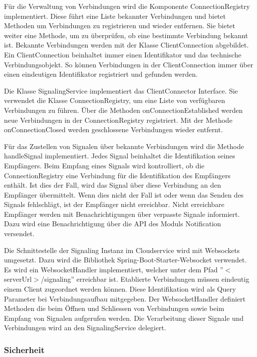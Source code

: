 Für die Verwaltung von Verbindungen wird die Komponente ConnectionRegistry implementiert.
Diese führt eine Liste bekannter Verbindungen und bietet Methoden um Verbindungen zu registrieren und wieder entfernen.
Sie bietet weiter eine Methode, um zu überprüfen, ob eine bestimmte Verbindung bekannt ist.
Bekannte Verbindungen werden mit der Klasse ClientConnection abgebildet.
Ein ClientConnection beinhaltet immer einen Identifikator und das technische Verbindungsobjekt.
So können Verbindungen in der ClientConnection immer über einen eindeutigen Identifikator registriert und gefunden werden.

Die Klasse SignalingService implementiert das ClientConnector Interface.
Sie verwendet die Klasse ConnectionRegistry, um eine Liste von verfügbaren Verbindungen zu führen.
Über die Methoden onConnectionEstablished werden neue Verbindungen in der ConnectionRegistry registriert.
Mit der Methode onConnectionClosed werden geschlossene Verbindungen wieder entfernt.

Für das Zustellen von Signalen über bekannte Verbindungen wird die Methode handleSignal implementiert.
Jedes Signal beinhaltet die Identifikation seines Empfängers.
Beim Empfang eines Signals wird kontrolliert, ob die ConnectionRegistry eine Verbindung für die Identifikation des Empfängers enthält.
Ist dies der Fall, wird das Signal über diese Verbindung an den Empfänger übermittelt.
Wenn dies nicht der Fall ist oder wenn das Senden des Signals fehlschlägt, ist der Empfänger nicht erreichbar.
Nicht erreichbare Empfänger werden mit Benachrichtigungen über verpasste Signale informiert.
Dazu wird eine Benachrichtigung über die API des Moduls Notification versendet.

Die Schnittestelle der Signaling Instanz im Cloudservice wird mit Websockets umgesetzt.
Dazu wird die Bibliothek Spring-Boot-Starter-Websocket verwendet.
Es wird ein WebsocketHandler implementiert, welcher unter dem Pfad ''$<$serverUrl$>$/signaling'' erreichbar ist.
Etablierte Verbindungen müssen eindeutig einem Client zugeordnet werden können.
Diese Identifikation wird als Query Parameter bei Verbindungsaufbau mitgegeben.
Der WebsocketHandler definiert Methoden die beim Öffnen und Schliessen von Verbindungen sowie beim Empfang von Signalen aufgerufen werden.
Die Verarbeitung dieser Signale und Verbindungen wird an den SignalingService delegiert.

\subsubsection{Sicherheit}

